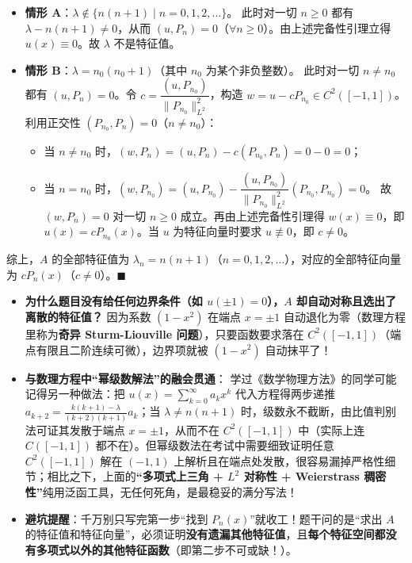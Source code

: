\documentclass[11pt,a4paper]{article}
\providecommand{\tightlist}{\setlength{\itemsep}{1.8pt}\setlength{\parskip}{0pt}}
\newcommand{\SubPillCoral}[1]{%
  \Needspace{4.5\baselineskip}\vspace{5.5pt}\noindent
  \tcbox[on line, colback=CoralSoft, colframe=CoralMain!45!BorderColor, boxrule=0.45pt,
    arc=3.5pt, left=6pt, right=6pt, top=2pt, bottom=2pt]{\small\bfseries\color{CoralMain}#1}%
  \par\nopagebreak[4]\vspace{3pt}%
}
\begin{document}
\begin{enumerate}
  \begin{itemize}
  \tightlist
  \item
    \textbf{情形 A}：\(\lambda \notin \{n(n+1) \mid n = 0, 1, 2, \dots\}\)。 此时对一切 \(n \ge 0\) 都有 \(\lambda - n(n+1) \neq 0\)，从而 \((u, P_n) = 0\)（\(\forall n \ge 0\)）。由上述完备性引理立得 \(u(x) \equiv 0\)。故 \(\lambda\) 不是特征值。
  \item
    \textbf{情形 B}：\(\lambda = n_0(n_0+1)\)（其中 \(n_0\) 为某个非负整数）。 此时对一切 \(n \neq n_0\) 都有 \((u, P_n) = 0\)。令 \(c = \dfrac{(u, P_{n_0})}{\|P_{n_0}\|_{L^2}^2}\)，构造 \(w = u - c P_{n_0} \in C^2([-1,1])\)。利用正交性 \((P_{n_0}, P_n) = 0\)（\(n \neq n_0\)）：

    \begin{itemize}
    \tightlist
    \item
      当 \(n \neq n_0\) 时，\((w, P_n) = (u, P_n) - c(P_{n_0}, P_n) = 0 - 0 = 0\)；
    \item
      当 \(n = n_0\) 时，\((w, P_{n_0}) = (u, P_{n_0}) - \dfrac{(u, P_{n_0})}{\|P_{n_0}\|_{L^2}^2}(P_{n_0}, P_{n_0}) = 0\)。 故 \((w, P_n) = 0\) 对一切 \(n \ge 0\) 成立。再由上述完备性引理得 \(w(x) \equiv 0\)，即 \(u(x) = c P_{n_0}(x)\)。当 \(u\) 为特征向量时要求 \(u \not\equiv 0\)，即 \(c \neq 0\)。
    \end{itemize}
  \end{itemize}
\end{enumerate}

综上，\(A\) 的全部特征值为 \(\lambda_n = n(n+1)\)（\(n = 0, 1, 2, \dots\)），对应的全部特征向量为 \(c P_n(x)\)（\(c \neq 0\)）。\(\blacksquare\)

\SubPillCoral{【考点复盘与避坑提示】}

\begin{itemize}
\tightlist
\item
  \textbf{为什么题目没有给任何边界条件（如 \(u(\pm 1)=0\)），\(A\) 却自动对称且选出了离散的特征值？} 因为系数 \((1-x^2)\) 在端点 \(x = \pm 1\) 自动退化为零（数理方程里称为\textbf{奇异 Sturm-Liouville 问题}），只要函数要求落在 \(C^2([-1,1])\)（端点有限且二阶连续可微），边界项就被 \((1-x^2)\) 自动抹平了！
\item
  \textbf{与数理方程中``幂级数解法''的融会贯通}： 学过《数学物理方法》的同学可能记得另一种做法：把 \(u(x) = \sum_{k=0}^\infty a_k x^k\) 代入方程得两步递推 \(a_{k+2} = \frac{k(k+1)-\lambda}{(k+2)(k+1)} a_k\)；当 \(\lambda \neq n(n+1)\) 时，级数永不截断，由比值判别法可证其发散于端点 \(x = \pm 1\)，从而不在 \(C^2([-1,1])\) 中（实际上连 \(C([-1,1])\) 都不在）。但幂级数法在考试中需要细致证明任意 \(C^2([-1,1])\) 解在 \((-1,1)\) 上解析且在端点处发散，很容易漏掉严格性细节；相比之下，上面的\textbf{``多项式上三角 + \(L^2\) 对称性 + Weierstrass 稠密性''}纯用泛函工具，无任何死角，是最稳妥的满分写法！
\item
  \textbf{避坑提醒}：千万别只写完第一步``找到 \(P_n(x)\)''就收工！题干问的是``求出 \(A\) 的特征值和特征向量''，必须证明\textbf{没有遗漏其他特征值}，且\textbf{每个特征空间都没有多项式以外的其他特征函数}（即第二步不可或缺！）。
\end{itemize}
\end{document}
